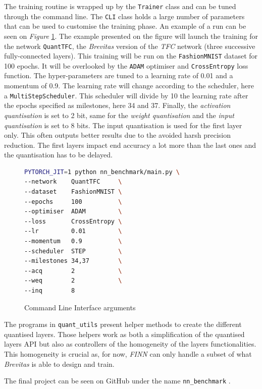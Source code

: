 The training routine is wrapped up by the \texttt{Trainer} class and can be tuned through the command line. The \texttt{CLI} class holds a large number of parameters that can be used to customise the training phase. An example of a run can be seen on \emph{Figure} \ref{fig:BenchCLI}. The example presented on the figure will launch the training for the network \texttt{QuantTFC}, the \emph{Brevitas} version of the \emph{TFC} network (three successive fully-connected layers). This training will be run on the \texttt{FashionMNIST} dataset for 100 epochs. It will be overlooked by the \texttt{ADAM} optimiser and \texttt{CrossEntropy} loss function. The hyper-parameters are tuned to a learning rate of 0.01 and a momentum of 0.9. The learning rate will change according to the scheduler, here a \texttt{MultiStepScheduler}. This scheduler will divide by 10 the learning rate after the epochs specified as milestones, here 34 and 37. Finally, the \emph{activation quantisation} is set to 2 bit, same for the \emph{weight quantisation} and the \emph{input quantisation} is set to 8 bits. The input quantisation is used for the first layer only. This often outputs better results due to the avoided harsh precision reduction. The first layers impact end accuracy a lot more than the last ones and the quantisation has to be delayed.

\begin{figure}[htbp]
\centering
\begin{lstlisting}[language=bash]
PYTORCH_JIT=1 python nn_benchmark/main.py \
--network    QuantTFC     \
--dataset    FashionMNIST \
--epochs     100          \
--optimiser  ADAM         \
--loss       CrossEntropy \
--lr         0.01         \
--momentum   0.9          \
--scheduler  STEP         \
--milestones 34,37        \
--acq        2            \
--weq        2            \
--inq        8
\end{lstlisting}
\caption[Command Line Interface]{Command Line Interface arguments}
	\label{fig:BenchCLI}
\end{figure}

The programs in \texttt{quant\_utils\/} present helper methods to create the different quantised layers. Those helpers work as both a simplification of the quantised layers API but also as controllers of the homogeneity of the layers functionalities. This homogeneity is crucial as, for now, \emph{FINN} can only handle a subset of what \emph{Brevitas} is able to design and train.

The final project can be seen on GitHub under the name \texttt{nn\_benchmark} \cite{BenchmarkRepo}.

